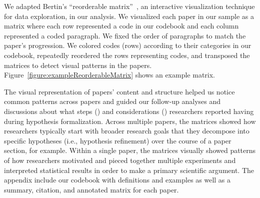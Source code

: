 \figureExampleReorderableMatrix

We adapted Bertin's ``reorderable matrix''~\cite{bertin2011graphics}, an
interactive visualization technique for data exploration, in our analysis. We
visualized each paper in our sample as a matrix where each row represented a
code in our codebook and each column represented a coded paragraph. We fixed the
order of paragraphs to match the paper's progression. We colored codes (rows)
according to their categories in our codebook, repeatedly reordered the rows
representing codes, and transposed the matrices to detect visual patterns in the
papers. Figure~\ref{figure:exampleReorderableMatrix} shows an example matrix. 

The visual representation of papers' content and structure helped us notice
common patterns across papers and guided our follow-up analyses and discussions about what steps
(\rqSteps) and considerations (\rqProcess) researchers reported having during
hypothesis formalization. Across multiple papers, the matrices showed how
researchers typically start with broader research goals that they decompose into
specific hypotheses (i.e., hypothesis refinement) over the course of a paper
section, for example. Within a single paper, the matrices visually showed patterns of how
researchers motivated and pieced together multiple experiments and interpreted
statistical results in order to make a primary scientific argument. The appendix include our codebook with definitions and examples as
well as a summary, citation, and annotated matrix for each paper.



